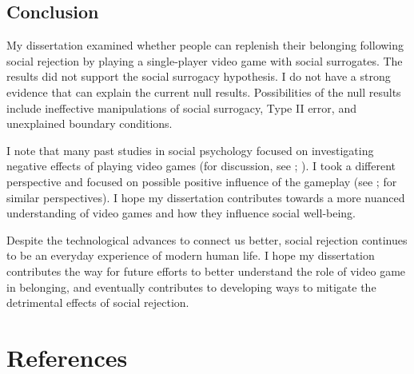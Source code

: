 \documentclass[
]{udthesis}
\begin{document}
\section{Conclusion}\label{conclusion-1}

My dissertation examined whether people can replenish their belonging
following social rejection by playing a single-player video game with
social surrogates. The results did not support the social surrogacy
hypothesis. I do not have a strong evidence that can explain the current
null results. Possibilities of the null results include ineffective
manipulations of social surrogacy, Type II error, and unexplained
boundary conditions.

I note that many past studies in social psychology focused on
investigating negative effects of playing video games (for discussion,
see ; ). I took a different perspective and
focused on possible positive influence of the gameplay (see ;  for
similar perspectives). I hope my dissertation contributes towards a more
nuanced understanding of video games and how they influence social
well-being.

Despite the technological advances to connect us better, social
rejection continues to be an everyday experience of modern human life. I
hope my dissertation contributes the way for future efforts to better
understand the role of video game in belonging, and eventually
contributes to developing ways to mitigate the detrimental effects of
social rejection.

\chapter*{References}\label{references}
\end{document}

